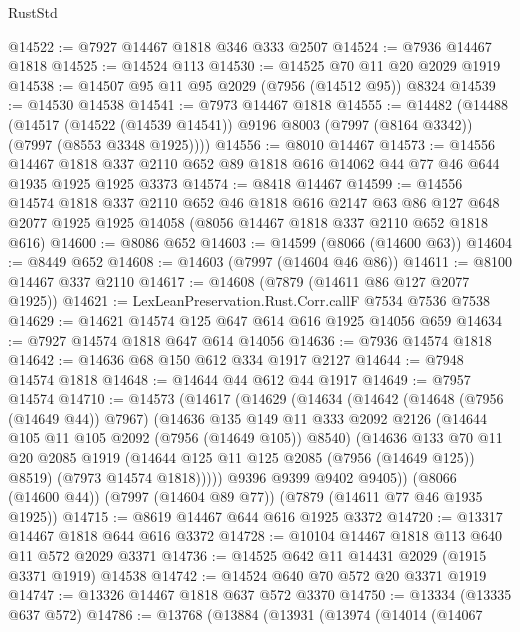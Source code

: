 \begin{lexlean}{RustStd}
\begin{coremodule}
{\begin{coremodule}
{{{{{{{{{{{{{{{{{{{{{{{{{{{{{{{{{{{{{{{{{{{@14522 := @7927 @14467 @1818 @346 @333 @2507
@14524 := @7936 @14467 @1818
@14525 := @14524 @113
@14530 := @14525 @70 @11 @20 @2029 @1919
@14538 := @14507 @95 @11 @95 @2029 (@7956 (@14512 @95)) @8324
@14539 := @14530 @14538
@14541 := @7973 @14467 @1818
@14555 := @14482
    (@14488
      (@14517
        (@14522 (@14539 @14541))
        @9196
        @8003
        (@7997 (@8164 @3342))
        (@7997 (@8553 @3348 @1925))))
@14556 := @8010 @14467
@14573 := @14556
    @14467
    @1818
    @337
    @2110
    @652
    @89
    @1818
    @616
    @14062
    @44
    @77
    @46
    @644
    @1935
    @1925
    @1925
    @3373
@14574 := @8418 @14467
@14599 := @14556
    @14574
    @1818
    @337
    @2110
    @652
    @46
    @1818
    @616
    @2147
    @63
    @86
    @127
    @648
    @2077
    @1925
    @1925
    @14058
    (@8056 @14467 @1818 @337 @2110 @652 @1818 @616)
@14600 := @8086 @652
@14603 := @14599 (@8066 (@14600 @63))
@14604 := @8449 @652
@14608 := @14603 (@7997 (@14604 @46 @86))
@14611 := @8100 @14467 @337 @2110
@14617 := @14608 (@7879 (@14611 @86 @127 @2077 @1925))
@14621 := LexLeanPreservation.Rust.Corr.callF @7534 @7536 @7538
@14629 := @14621 @14574 @125 @647 @614 @616 @1925 @14056 @659
@14634 := @7927 @14574 @1818 @647 @614 @14056
@14636 := @7936 @14574 @1818
@14642 := @14636 @68 @150 @612 @334 @1917 @2127
@14644 := @7948 @14574 @1818
@14648 := @14644 @44 @612 @44 @1917
@14649 := @7957 @14574
@14710 := @14573
    (@14617
      (@14629
        (@14634
          (@14642
            (@14648 (@7956 (@14649 @44)) @7967)
            (@14636
              @135
              @149
              @11
              @333
              @2092
              @2126
              (@14644 @105 @11 @105 @2092 (@7956 (@14649 @105)) @8540)
              (@14636
                @133
                @70
                @11
                @20
                @2085
                @1919
                (@14644 @125 @11 @125 @2085 (@7956 (@14649 @125)) @8519)
                (@7973 @14574 @1818)))))
        @9396
        @9399
        @9402
        @9405))
    (@8066 (@14600 @44))
    (@7997 (@14604 @89 @77))
    (@7879 (@14611 @77 @46 @1935 @1925))
@14715 := @8619 @14467 @644 @616 @1925 @3372
@14720 := @13317 @14467 @1818 @644 @616 @3372
@14728 := @10104 @14467 @1818 @113 @640 @11 @572 @2029 @3371
@14736 := @14525 @642 @11 @14431 @2029 (@1915 @3371 @1919) @14538
@14742 := @14524 @640 @70 @572 @20 @3371 @1919
@14747 := @13326 @14467 @1818 @637 @572 @3370
@14750 := @13334 (@13335 @637 @572)
@14786 := @13768
    (@13884
      (@13931
        (@13974
          (@14014
            (@14067
}}}}}}}}}}}}}}}}}}}}}}}}}}}}}}}}}}}}}}}}}}}
\end{coremodule}}
\end{coremodule}
\end{lexlean}
